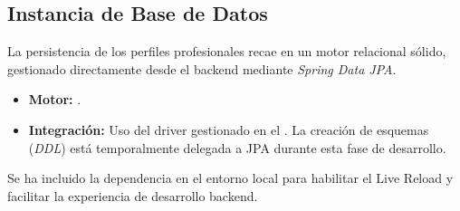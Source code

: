 \subsection{Instancia de Base de Datos}
La persistencia de los perfiles profesionales recae en un motor relacional sólido, gestionado directamente desde el backend mediante \textit{Spring Data JPA}.

\begin{itemize}[noitemsep]
    \item \textbf{Motor:} .
    \item \textbf{Integración:} Uso del driver  gestionado en el . La creación de esquemas (\textit{DDL}) está temporalmente delegada a JPA durante esta fase de desarrollo.
\end{itemize}

\begin{NotaTecnica}
    Se ha incluido la dependencia  en el entorno local para habilitar el Live Reload y facilitar la experiencia de desarrollo backend.
\end{NotaTecnica}